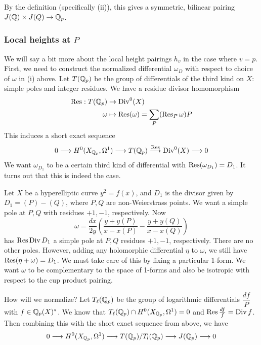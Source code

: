 By the definition (specifically (ii)), this gives a symmetric, bilinear pairing $J(\mathbb{Q}) \times J(Q) \to \mathbb{Q}_p$.
 


\subsubsection{Local heights at $P$}

We will say a bit more about the local height pairings $h_v$ in the case where $v= p$. First, we need to construct the normalized differential $\omega_D$ with respect to choice of $\omega$ in (i) above. Let $T(\mathbb{Q}_p)$ be the group of differentials of the third kind on $X$: simple poles and integer residues. We have a residue divisor homomorphism
	\[
	\begin{aligned}
	\operatorname{Res}: T(\mathbb{Q}_p) &\to \operatorname{Div}^0(X) \\
	\omega &\mapsto \operatorname{Res}(\omega) = \sum_P (\operatorname{Res}_P \omega) P
	\end{aligned}
	\]
This induces a short exact sequence
	\[
	0 \stackrel{}{\longrightarrow} H^0(X_{\mathbb{Q}_p}, \Omega^1) \stackrel{}{\longrightarrow} T(\mathbb{Q}_p) \stackrel{\operatorname{Res}}{\longrightarrow} \operatorname{Div}^0(X) \stackrel{}{\longrightarrow} 0
	\]
We want $\omega_{D_1}$ to be a certain third kind of differential with $\operatorname{Res}(\omega_{D_1})= D_1$. It turns out that this is indeed the case. 


\begin{ex}
Let $X$ be a hyperelliptic curve $y^2= f(x)$, and $D_1$ is the divisor given by $D_1= (P) - (Q)$, where $P,Q$ are non-Weierstrass points. We want a simple pole at $P,Q$ with residues $+1, -1$, respectively. Now
	\[
	\omega= \dfrac{dx}{2y} \left( \dfrac{y+y(P)}{x-x(P)} - \dfrac{y+y(Q)}{x-x(Q)} \right)
	\]
has $\operatorname{Res} \operatorname{Div} D_1$  a simple pole at $P,Q$ residues $+1,-1$, respectively. There are no other poles. However, adding any holomorphic differential $\eta$ to $\omega$, we still have $\operatorname{Res}(\eta+\omega)= D_1$. We must take care of this by fixing a particular 1-form. We want $\omega$ to be complementary to the space of 1-forms and also be isotropic with respect to the cup product pairing. \xqed
\end{ex}


How will we normalize? Let $T_\ell(\mathbb{Q}_p)$ be the group of logarithmic differentials $\dfrac{df}{P}$ with $f \in \mathbb{Q}_p(X)^*$. We know that $T_\ell(\mathbb{Q}_p) \cap H^0(X_{\mathbb{Q}_p},\Omega^1)= 0$ and $\operatorname{Res} \frac{df}{f}= \operatorname{Div} f$. Then combining this with the short exact sequence from above, we have 
	\[
	0 \stackrel{}{\longrightarrow} H^0(X_{\mathbb{Q}_p}, \Omega^1) \stackrel{}{\longrightarrow} T(\mathbb{Q}_p)/T_l(\mathbb{Q}_p) \stackrel{}{\longrightarrow} J(\mathbb{Q}_p) \stackrel{}{\longrightarrow} 0
	\] 


